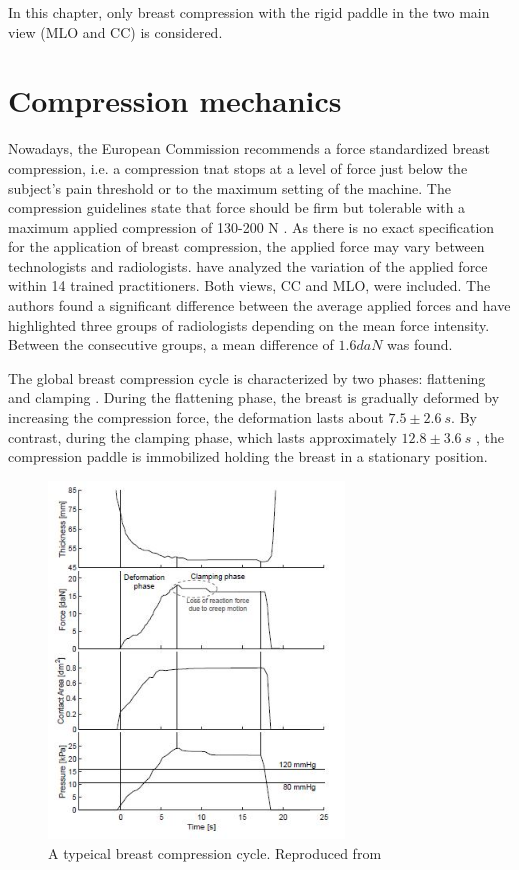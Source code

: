 In this chapter, only breast compression with the rigid paddle in the two main view (MLO and CC) is considered.

\section{Compression mechanics} \label{subsec:compressionmechanics}
Nowadays, the European Commission recommends a force standardized breast compression, i.e. a compression tnat stops at a level of force just below the subject's pain threshold or to the maximum setting of the machine.  The compression guidelines state that force should be firm but tolerable with a maximum applied compression of 130-200 N \citep{perry_european_2008}. As there is no exact specification for the application of breast compression, the applied force may vary between technologists and radiologists. \cite{mercer_practitioner_2013} have analyzed the variation of the applied force within 14 trained practitioners. Both views, CC and MLO, were included. The authors found a significant difference between the average applied forces and have highlighted three groups of radiologists depending on the mean force intensity. Between the consecutive groups, a mean difference of $1.6daN$ was found. 

The global breast compression cycle is characterized by two phases: flattening and clamping \citep{de_pain_2015}. During the flattening phase, the breast is gradually deformed by increasing the compression force, the deformation lasts about  $7.5 \pm 2.6\ s$. By contrast, during the clamping phase, which lasts approximately $12.8 \pm 3.6\ s$ , the compression paddle is immobilized holding the breast in a stationary position. 
\begin{figure}[!h]
\centering
\includegraphics[width=0.7\textwidth,keepaspectratio]{figures/breast_compression_cycle.jpg} 
\caption{A typeical breast compression cycle. Reproduced from \cite{groot_towards_2015}}\label{fig:breast_compression_cycle}
\end{figure}

